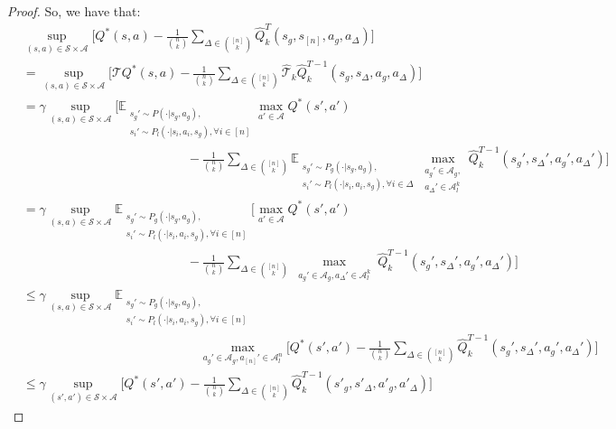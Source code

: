 \documentclass{article}
\theoremstyle{plain}
\theoremstyle{definition}
\def\E{\mathbb{E}}
\begin{document}
\begin{proof}
So, we have that:
\begin{align*}
&\sup_{(s,a)\in\mathcal{S}\times\mathcal{A}}\bigg[Q^*(s,a) - \frac{1}{{n\choose k}}\sum_{\Delta \in {[n]\choose k}}\hat{Q}_k^T (s_g,s_{[n]},a_g,a_\Delta)\bigg] \\
&= \sup_{(s,a)\in\mathcal{S}\times\mathcal{A}}\bigg[\mathcal{T}Q^*(s,a) - \frac{1}{{n\choose k}}\sum_{\Delta \in {[n]\choose k}}\hat{\mathcal{T}}_k\hat{Q}_k^{T-1}(s_g,s_{\Delta},a_g,a_{\Delta})\bigg] \\
    &= \gamma\sup_{(s,a)\in\mathcal{S}\times\mathcal{A}}\bigg[\mathbb{E}_{\substack{s_g'\sim {P}(\cdot|s_g,a_g), \\ s_i'\sim P_l(\cdot|s_i,a_i,s_g),\forall i\in[n]}}\max_{a'\in \mathcal{A}}Q^*(s',a') \\
     &\quad\quad\quad\quad\quad\quad\quad\quad\quad\quad\quad\quad\quad - \frac{1}{{n\choose k}}\sum_{\Delta\in {[n]\choose k}}\E_{\substack{s_g'\sim {P}_g(\cdot|s_g,a_g), \\ s_i'\sim {P}_l(\cdot|s_i,a_i,s_g), \forall i\in\Delta}}\max_{\substack{a_g'\in\mathcal{A}_g,\\a_\Delta'\in\mathcal{A}_l^k}}\hat{Q}_k^{T-1}(s_g',s_\Delta',a_g',a_\Delta')\bigg] \\
    &= \gamma\sup_{(s,a)\in\mathcal{S}\times\mathcal{A}} \E_{\substack{s_g'\sim {P}_g(\cdot|s_g,a_g), \\ s_i'\sim P_l(\cdot|s_i,a_i,s_g), \forall i\in [n]}} \bigg[\max_{a'\in\mathcal{A}}Q^*(s',a') \\
    &\quad\quad\quad\quad\quad\quad\quad\quad\quad\quad\quad\quad\quad - \frac{1}{{n\choose k}}\sum_{\Delta\in{[n]\choose k}}\max_{\substack{a_g'\in\mathcal{A}_g,a_\Delta'\in\mathcal{A}_l^k}}\hat{Q}_k^{T-1}(s_g',s_\Delta',a_g',a_\Delta')\bigg]\\
    &\leq \gamma\sup_{(s,a)\in\mathcal{S}\times\mathcal{A}} \E_{\substack{s_g'\sim {P}_g(\cdot|s_g,a_g), \\ s_i'\sim P_l(\cdot|s_i,a_i,s_g), \forall i\in [n]}}\\
    &\quad\quad\quad\quad\quad\quad\quad\quad\quad\quad\quad\quad\quad\quad \max_{a_g'\in\mathcal{A}_g,a_{[n]}'\in\mathcal{A}_l^n}\bigg[Q^*(s',a') - \frac{1}{{n\choose k}}\sum_{\Delta\in{[n]\choose k}}\hat{Q}_k^{T-1}(s_g',s_\Delta',a_g',a_\Delta')\bigg] \\
    &\leq \gamma \sup_{(s',a')\in  \mathcal{S}\times \mathcal{A}} \bigg[Q^*(s',a') - \frac{1}{{n\choose k}}\sum_{\Delta\in{[n]\choose k}}\hat{Q}_k^{T-1}(s'_g,s'_\Delta,a'_g,a'_\Delta)\bigg]
\end{align*}

\end{proof}
\end{document}
